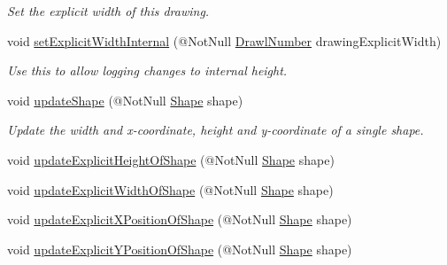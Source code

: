 \begin{DoxyCompactItemize}
\begin{DoxyCompactList}\small\item\em Set the explicit width of this drawing. \end{DoxyCompactList}\item 
void \hyperlink{classcom_1_1aarrelaakso_1_1drawl_1_1_drawing_a062d982652f679941892b0669fafa640}{set\+Explicit\+Width\+Internal} (@Not\+Null \hyperlink{classcom_1_1aarrelaakso_1_1drawl_1_1_drawl_number}{Drawl\+Number} drawing\+Explicit\+Width)
\begin{DoxyCompactList}\small\item\em Use this to allow logging changes to internal height. \end{DoxyCompactList}\item 
void \hyperlink{classcom_1_1aarrelaakso_1_1drawl_1_1_drawing_ad8ad4f61392d01bd9e43267e23e3bb80}{update\+Shape} (@Not\+Null \hyperlink{classcom_1_1aarrelaakso_1_1drawl_1_1_shape}{Shape} shape)
\begin{DoxyCompactList}\small\item\em Update the width and x-\/coordinate, height and y-\/coordinate of a single shape. \end{DoxyCompactList}\item 
void \hyperlink{classcom_1_1aarrelaakso_1_1drawl_1_1_drawing_ae6230a0043cb9a05bd33419c5c136b80}{update\+Explicit\+Height\+Of\+Shape} (@Not\+Null \hyperlink{classcom_1_1aarrelaakso_1_1drawl_1_1_shape}{Shape} shape)
\item 
void \hyperlink{classcom_1_1aarrelaakso_1_1drawl_1_1_drawing_a134dd73b431478205eb941ca3a88af7e}{update\+Explicit\+Width\+Of\+Shape} (@Not\+Null \hyperlink{classcom_1_1aarrelaakso_1_1drawl_1_1_shape}{Shape} shape)
\item 
void \hyperlink{classcom_1_1aarrelaakso_1_1drawl_1_1_drawing_a534b929a2b7e038af13f19b6749c6cdc}{update\+Explicit\+X\+Position\+Of\+Shape} (@Not\+Null \hyperlink{classcom_1_1aarrelaakso_1_1drawl_1_1_shape}{Shape} shape)
\item 
void \hyperlink{classcom_1_1aarrelaakso_1_1drawl_1_1_drawing_ae3aa0c7b937d8a3a14677401b90a077f}{update\+Explicit\+Y\+Position\+Of\+Shape} (@Not\+Null \hyperlink{classcom_1_1aarrelaakso_1_1drawl_1_1_shape}{Shape} shape)
\end{DoxyCompactItemize}
